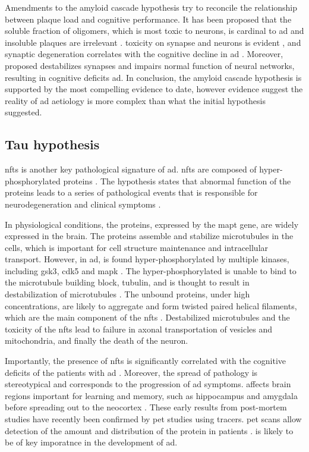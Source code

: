 Amendments to the amyloid cascade hypothesis try to reconcile the relationship between plaque load and cognitive performance. It has been proposed that the soluble fraction of \abeta{} oligomers, which is most toxic to neurons, is cardinal to \gls{ad} and insoluble plaques are irrelevant \citep{ferreira15}. \abeta{} toxicity on synapse and neurons is evident \citep{ferreira15},  and synaptic degeneration correlates with the cognitive decline in \gls{ad} \citep{selkoe02, coleman04}. Moreover, \citet{canter16} proposed \abeta{} destabilizes synapses and impairs normal function of neural networks, resulting in cognitive deficits \gls{ad}. In conclusion, the amyloid cascade hypothesis is supported by the most compelling evidence to date, however evidence suggest the reality of \gls{ad} aetiology is more complex than what the initial hypothesis suggested.

\subsection{Tau hypothesis}

\Glspl{nft} is another key pathological signature of \gls{ad}. \Glspl{nft} are composed of hyper-phosphorylated \atau{} proteins \citep{grundke-iqbal86}. The \atau{} hypothesis states that abnormal function of the \atau{} proteins leads to a series of pathological events that is responsible for neurodegeneration and clinical symptoms \citep{goedert11}.

In physiological conditions, the \atau{} proteins, expressed by the \gls{mapt} gene, are widely expressed in the brain. The \atau{} proteins assemble and stabilize microtubules in the cells, which is important for cell structure maintenance and intracellular transport. However, in \gls{ad}, \atau{} is found hyper-phosphorylated by multiple kinases, including \gls{gsk3}, \gls{cdk5} and \gls{mapk} \citep{singh94}. The hyper-phosphorylated \atau{} is unable to bind to the microtubule building block, tubulin, and is thought to result in destabilization of microtubules \citep{bramblett93, yoshida93, alonso94}. The unbound \atau{} proteins, under high concentrations, are likely to aggregate and form twisted paired helical filaments, which are the main component of the \glspl{nft} \citep{kidd63, kuret05}. Destabilized microtubules and the toxicity of the \glspl{nft} lead to failure in axonal transportation of vesicles and mitochondria, and finally the death of the neuron.

Importantly, the presence of \glspl{nft} is significantly correlated with the cognitive deficits of the patients with \gls{ad} \citep{hyman12}. Moreover, the spread of \atau{} pathology is stereotypical and  corresponds to the progression of \gls{ad} symptoms. \atau{} affects brain regions important for learning and memory, such as hippocampus and amygdala before spreading out to the neocortex \citep{braak91}. These early results from post-mortem studies have recently been confirmed by \gls{pet} studies using \atau{} tracers. \gls{pet} scans allow detection of the amount and distribution of the \atau{} protein in patients \citep{ossenkoppele16, scholl16}. \atau{} is likely to be of key imporatnce in the development of \gls{ad}.
 
